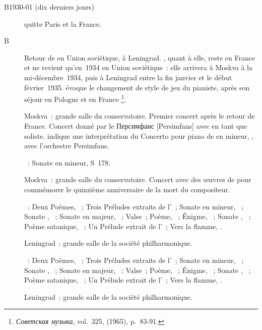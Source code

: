 \begin{description}
 \item[B1930-01 (dix derniers jours)]
 \VSofronitsky{} quitte Paris et la France.
 \item[B]
 Retour de \VSofronitsky{} en Union soviétique, à Leningrad.
 \EScriabina{}, quant à elle, reste en France et ne revient qu'en~1934 en
 Union soviétique~: elle arrivera à Moskva à la mi-décembre~1934, puis à
 Leningrad entre la fin janvier et le début février~1935.
 \citet[p.~90]{Bogdanov65} évoque le changement de style de jeu du pianiste,
 après son séjour en Pologne et en France%
 \footnote{\foreignlanguage{russian}{\emph{Советская музыка}}, vol.~325,
  (1965), p.~83-91.}.
 \item[]
 Moskva~: grande salle du conservatoire.
 Premier concert après le retour de France.
 Concert donné par le \foreignlanguage{russian}{Персимфанс}
 [Persimfans] avec \VSofronitsky{} en tant que
 soliste.
 \citet[p.~152]{Nekrasova08} indique une interprétation du Concerto pour
 piano de \Scriabine{} en \kF \Sharp mineur, , avec l'orchestre
 Persimfans.

 \textsc{\Liszt{}}~: Sonate en \kB mineur, S~178.
 \item[]
 Moskva~: grande salle du conservatoire.
 Concert avec des œuvres de \Scriabine{} pour commémorer le quinzième
 anniversaire de la mort du compositeur.

 \textsc{\Scriabine{}}~: Deux Poèmes, ~; Trois Préludes extraits de
 l'~; Sonate  en \kF \Sharp mineur, ~; Sonate
 , ~; Sonate  en \kF \Sharp majeur, ~;
 Valse~; Poème,  ~; Énigme,  ~; Sonate
 , ~; Poème satanique, ~; Un Prélude extrait de
 l'~; Vers la flamme, .
 \item[]
 Leningrad~: grande salle de la société philharmonique.

 \textsc{\Scriabine{}}~: Deux Poèmes, ~; Trois Préludes extraits de
 l'~; Sonate  en \kF \Sharp mineur, ~; Sonate
 , ~; Sonate  en \kF \Sharp majeur, ~;
 Valse~; Poème,  ~; Énigme,  ~; Sonate
 , ~; Poème satanique, ~; Un Prélude extrait de
 l'~; Vers la flamme, .
 \item[]
 Leningrad~: grande salle de la société philharmonique.


\end{description}
